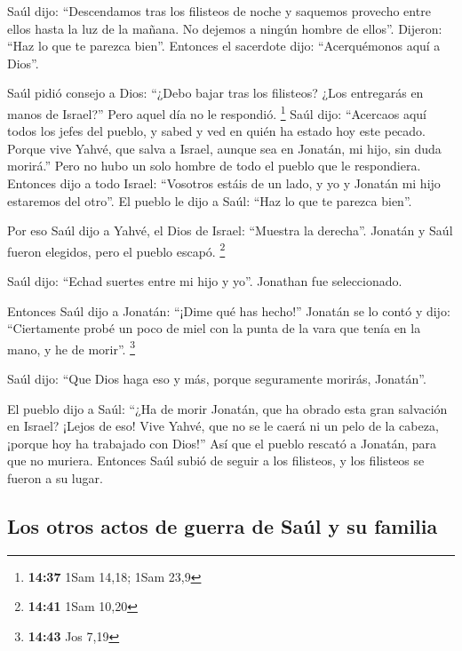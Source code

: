  Saúl dijo: ``Descendamos tras los filisteos de noche y
saquemos provecho entre ellos hasta la luz de la mañana. No dejemos a
ningún hombre de ellos''. Dijeron: ``Haz lo que te parezca bien''.
Entonces el sacerdote dijo: ``Acerquémonos aquí a Dios''.

 Saúl pidió consejo a Dios: ``¿Debo bajar tras los
filisteos? ¿Los entregarás en manos de Israel?'' Pero aquel día no le
respondió. \footnote{\textbf{14:37} 1Sam 14,18; 1Sam 23,9}
 Saúl dijo: ``Acercaos aquí todos los jefes del pueblo, y
sabed y ved en quién ha estado hoy este pecado.  Porque
vive Yahvé, que salva a Israel, aunque sea en Jonatán, mi hijo, sin duda
morirá.'' Pero no hubo un solo hombre de todo el pueblo que le
respondiera.  Entonces dijo a todo Israel: ``Vosotros
estáis de un lado, y yo y Jonatán mi hijo estaremos del otro''. El
pueblo le dijo a Saúl: ``Haz lo que te parezca bien''.

 Por eso Saúl dijo a Yahvé, el Dios de Israel: ``Muestra
la derecha''. Jonatán y Saúl fueron elegidos, pero el pueblo escapó.
\footnote{\textbf{14:41} 1Sam 10,20}

 Saúl dijo: ``Echad suertes entre mi hijo y yo''.
Jonathan fue seleccionado.

 Entonces Saúl dijo a Jonatán: ``¡Dime qué has hecho!''
Jonatán se lo contó y dijo: ``Ciertamente probé un poco de miel con la
punta de la vara que tenía en la mano, y he de morir''. \footnote{\textbf{14:43}
  Jos 7,19}

 Saúl dijo: ``Que Dios haga eso y más, porque seguramente
morirás, Jonatán''.

 El pueblo dijo a Saúl: ``¿Ha de morir Jonatán, que ha
obrado esta gran salvación en Israel? ¡Lejos de eso! Vive Yahvé, que no
se le caerá ni un pelo de la cabeza, ¡porque hoy ha trabajado con
Dios!'' Así que el pueblo rescató a Jonatán, para que no muriera.
 Entonces Saúl subió de seguir a los filisteos, y los
filisteos se fueron a su lugar.

\hypertarget{los-otros-actos-de-guerra-de-sauxfal-y-su-familia}{%
\subsection{Los otros actos de guerra de Saúl y su
familia}\label{los-otros-actos-de-guerra-de-sauxfal-y-su-familia}}

